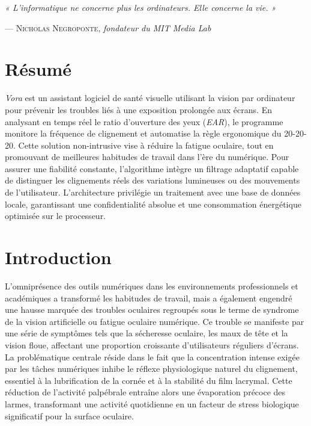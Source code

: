 \documentclass{rapportbrebeuf}
\begin{document}
\fairePageTitre
\faireTDM
\debutCorps

\epigraph{\textit{« L'informatique ne concerne plus les ordinateurs. Elle concerne la vie. »}}{--- \textsc{Nicholas Negroponte}, \textit{fondateur du MIT Media Lab}}
\vspace{1em}

\section{Résumé}


\textit{Vora} est un assistant logiciel de santé visuelle utilisant la vision par ordinateur pour
prévenir les troubles liés à une exposition prolongée aux écrans. En analysant en temps réel le
ratio d'ouverture des yeux (\textit{EAR}), le programme monitore la fréquence de clignement et
automatise la règle ergonomique du 20-20-20. Cette solution non-intrusive vise à réduire la
fatigue oculaire, tout en promouvant de meilleures habitudes de travail dans l'ère du numérique. Pour assurer une fiabilité constante, l'algorithme intègre un filtrage adaptatif capable de distinguer les clignements réels des variations lumineuses ou des mouvements de l'utilisateur. L'architecture privilégie un traitement avec une base de données locale, garantissant une confidentialité absolue et une consommation énergétique optimisée sur le processeur.

\newpage
\section{Introduction}

L'omniprésence des outils numériques dans les environnements professionnels et académiques a transformé les habitudes de travail, mais a également engendré une hausse marquée des troubles oculaires regroupés sous le terme de syndrome de la vision artificielle ou fatigue oculaire numérique. Ce trouble se manifeste par une série de symptômes tels que la sécheresse oculaire, les maux de tête et la vision floue, affectant une proportion croissante d'utilisateurs réguliers d'écrans. La problématique centrale réside dans le fait que la concentration intense exigée par les tâches numériques inhibe le réflexe physiologique naturel du clignement, essentiel à la lubrification de la cornée et à la stabilité du film lacrymal. Cette réduction de l'activité palpébrale entraîne alors une évaporation précoce des larmes, transformant une activité quotidienne en un facteur de stress biologique significatif pour la surface oculaire.
\end{document}
